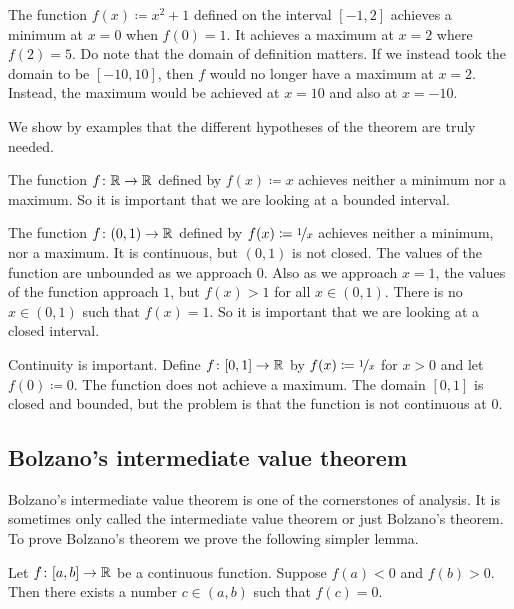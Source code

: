 \begin{example}
The function $f(x) \coloneqq x^2+1$ defined on the interval $[-1,2]$ achieves a minimum
at $x=0$ when $f(0) = 1$.  It achieves a maximum at $x=2$ where $f(2) = 5$.
Do note that the domain of definition matters.  If we instead took the domain
to be $[-10,10]$, then $f$ would no longer have a maximum at $x=2$.
Instead,
the maximum would be achieved at $x=10$ and also at $x=-10$.
\end{example}

We show by examples that the different hypotheses of the theorem are
truly needed.

\begin{example}
The function $f \colon {\mathbb{R}} \to {\mathbb{R}}$ defined by $f(x) \coloneqq x$
achieves neither a minimum nor a maximum.  So it is important that
we are looking at a bounded interval.
\end{example}

\begin{example}
The function $f \colon (0,1) \to {\mathbb{R}}$ defined by $f(x) \coloneqq \nicefrac{1}{x}$
achieves neither a minimum, nor a maximum.
It is continuous, but $(0,1)$ is not closed.
The values of the function are
unbounded as we approach $0$.  Also as we approach $x=1$, the values of the
function approach $1$, but $f(x) > 1$ for all $x \in (0,1)$.  There is
no $x \in (0,1)$ such that $f(x) = 1$.  So it is important that
we are looking at a closed interval.
\end{example}

\begin{example}
Continuity is important.
Define $f \colon [0,1] \to {\mathbb{R}}$ by 
$f(x) \coloneqq \nicefrac{1}{x}$ for $x > 0$ and let $f(0) \coloneqq 0$.
The function does not achieve a maximum.  The domain $[0,1]$ is closed and
bounded, but the problem is that
the function is not continuous at 0.
\end{example}

\subsection{Bolzano's intermediate value theorem}

Bolzano's intermediate value theorem is one of the cornerstones of analysis.
It is sometimes only called the intermediate value theorem or just
Bolzano's theorem.  To prove Bolzano's theorem we prove the
following simpler lemma.

\begin{lemma} \label{IVT:lemma}
Let $f \colon [a,b] \to {\mathbb{R}}$ be a continuous function.
Suppose $f(a) < 0$ and $f(b) > 0$. 
Then there exists a number $c \in (a,b)$
such that $f(c) = 0$.
\end{lemma}

